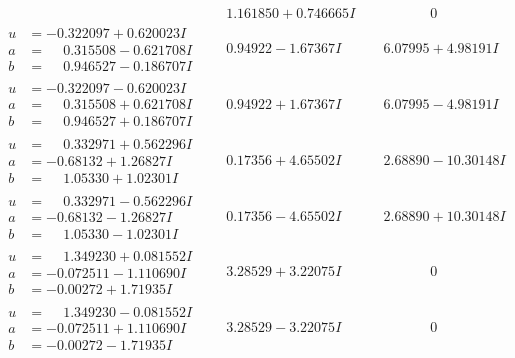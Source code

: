 \documentclass[1p]{elsarticle_modified}
\theoremstyle{definition}
\begin{document}
$$\begin{array}{c|c|c}
 & \phantom{-}1.161850 + 0.746665 I & \phantom{-0.000000 } 0 \\ \hline\begin{aligned}
u &= -0.322097 + 0.620023 I \\
a &= \phantom{-}0.315508 - 0.621708 I \\
b &= \phantom{-}0.946527 - 0.186707 I\end{aligned}
 & \phantom{-}0.94922 - 1.67367 I & \phantom{-}6.07995 + 4.98191 I \\ \hline\begin{aligned}
u &= -0.322097 - 0.620023 I \\
a &= \phantom{-}0.315508 + 0.621708 I \\
b &= \phantom{-}0.946527 + 0.186707 I\end{aligned}
 & \phantom{-}0.94922 + 1.67367 I & \phantom{-}6.07995 - 4.98191 I \\ \hline\begin{aligned}
u &= \phantom{-}0.332971 + 0.562296 I \\
a &= -0.68132 + 1.26827 I \\
b &= \phantom{-}1.05330 + 1.02301 I\end{aligned}
 & \phantom{-}0.17356 + 4.65502 I & \phantom{-}2.68890 - 10.30148 I \\ \hline\begin{aligned}
u &= \phantom{-}0.332971 - 0.562296 I \\
a &= -0.68132 - 1.26827 I \\
b &= \phantom{-}1.05330 - 1.02301 I\end{aligned}
 & \phantom{-}0.17356 - 4.65502 I & \phantom{-}2.68890 + 10.30148 I \\ \hline\begin{aligned}
u &= \phantom{-}1.349230 + 0.081552 I \\
a &= -0.072511 - 1.110690 I \\
b &= -0.00272 + 1.71935 I\end{aligned}
 & \phantom{-}3.28529 + 3.22075 I & \phantom{-0.000000 } 0 \\ \hline\begin{aligned}
u &= \phantom{-}1.349230 - 0.081552 I \\
a &= -0.072511 + 1.110690 I \\
b &= -0.00272 - 1.71935 I\end{aligned}
 & \phantom{-}3.28529 - 3.22075 I & \phantom{-0.000000 } 0 \\ \hline\begin{aligned}

\end{aligned}
\end{array}$$
\end{document}
